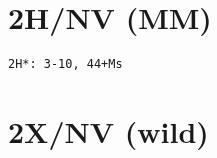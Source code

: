 \section{2H/NV (MM)}

\begin{lstlisting}
2H*: 3-10, 44+Ms
\end{lstlisting} 

\section{2X/NV (wild)}

